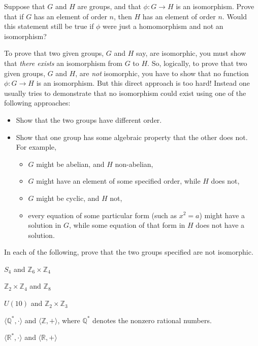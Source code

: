 \begin{problem}
Suppose that \(G\) and \(H\) are groups, and that \(\phi : G \longrightarrow H \) is an isomorphism. Prove that if \(G\) has an element of order \(n\), then \(H\) has an element of order \(n\). Would this statement still be true if \(\phi\) were just a homomorphism and not an isomorphism?
\end{problem}

To prove that two given groups, \(G\) and \(H\) say, are isomorphic, you must show that \emph{there exists} an isomorphism from \(G\) to \(H\).  So, logically, to prove that two given groups, \(G\) and \(H\), are \emph{not} isomorphic, you have to show that no function \(\phi: G \longrightarrow H \) is an isomorphism. But this direct approach is too hard! Instead one usually tries to demonstrate that no isomorphism could exist using one of the following approaches:
\begin{itemize}
  \item Show that the two groups have different order.
  \item Show that one group has some algebraic property that the other does not. For example,
  \begin{itemize}
    \item \(G\) might be abelian, and \(H\) non-abelian,
    \item \(G\) might have an element of some specified order, while \(H\) does not,
    \item \(G\) might be cyclic, and \(H\) not,
    \item every equation of some particular form (such as \(x^2 = a\)) might have a solution in \(G\), while some equation of that form in \(H\) does not have a solution.
  \end{itemize}
\end{itemize}

\begin{problem}
In each of the following, prove that the two groups specified are
not isomorphic.
      \begin{problemparts}
  \item \( S_4 \) and \(\mathbb{Z}_6 \times \mathbb{Z}_4\)
  \item \(\mathbb{Z}_2 \times \mathbb{Z}_4\) and \( \mathbb{Z}_8 \)
  \item \(U(10)\) and \(\mathbb{Z}_2 \times \mathbb{Z}_3\)
  \item \(\langle \mathbb{Q}^*, \cdot \rangle \) and \( \langle \mathbb{Z}, + \rangle \), where \(\mathbb{Q}^*\) denotes the nonzero rational numbers.
  \item \(\langle \mathbb{R}^*, \cdot \rangle \) and \( \langle \mathbb{R}, + \rangle \)
\end{problemparts}
\end{problem}

